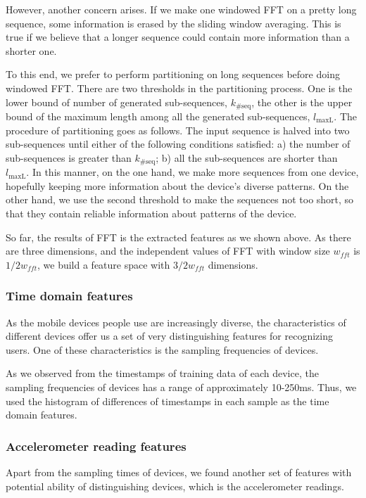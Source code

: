 \documentclass{article} %
\begin{document}
However, another concern arises. If we make one windowed FFT on a pretty long sequence, some information is erased by the sliding window averaging. This is true if we believe that a longer sequence could contain more information than a shorter one.

To this end, we prefer to perform partitioning on long sequences before doing windowed FFT. There are two thresholds in the partitioning process. One is the lower bound of number of generated sub-sequences, $k_\mathrm{\#seq}$, the other is the upper bound of the maximum length among all the generated sub-sequences, $l_\mathrm{maxL}$. The procedure of partitioning goes as follows. The input sequence is halved into two sub-sequences until either of the following conditions satisfied: a) the number of sub-sequences is greater than $k_\mathrm{\#seq}$; b) all the sub-sequences are shorter than $l_\mathrm{maxL}$. In this manner, on the one hand, we make more sequences from one device, hopefully keeping more information about the device's diverse patterns. On the other hand, we use the second threshold to make the sequences not too short, so that they contain reliable information about patterns of the device.

So far, the results of FFT is the extracted features as we shown above. As there are three dimensions, and the independent values of FFT with window size $w_{fft}$ is $1/2w_{fft}$, we build a feature space with $3/2w_{fft}$ dimensions.

\subsubsection{Time domain features}
As the mobile devices people use are increasingly diverse, the characteristics of different devices offer us a set of very distinguishing features for recognizing users. One of these characteristics is the sampling frequencies of devices.

As we observed from the timestamps of training data of each device, the sampling frequencies of devices has a range of approximately 10-250ms. Thus, we used the histogram of differences of timestamps in each sample as the time domain features.

\subsubsection{Accelerometer reading features}
Apart from the sampling times of devices, we found another set of features with potential ability of distinguishing devices, which is the accelerometer readings.
\end{document}

